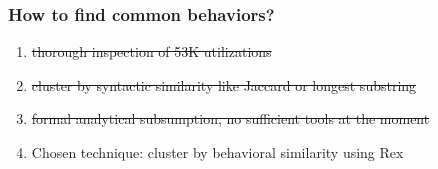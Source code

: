 \begin{frame}
\frametitle{How to find common behaviors?}
\begin{enumerate}
\item \sout{thorough inspection of 53K utilizations}
\item<2-> \sout{cluster by syntactic similarity like Jaccard or longest substring}
\item<3-> \sout{formal analytical subsumption, no sufficient tools at the moment}
\item<4-> \begin{Large}Chosen technique: cluster by behavioral similarity using Rex \end{Large}
\end{enumerate}
\end{frame}



